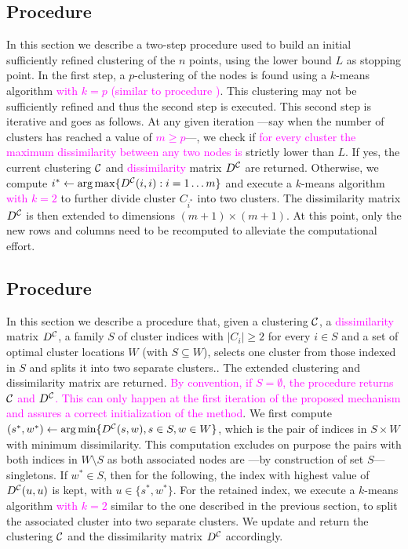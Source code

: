 \documentclass[ijoo,nonblindrev]{informs-ijoo}
\begin{document}
\subsection{Procedure \label{section:decrclust:initclust}}

In this section we describe a two-step procedure used to build an initial sufficiently refined clustering of the $n$ points, using the lower bound $L$ as stopping point. In the first step, a $p$-clustering of the nodes is found using a $k$-means algorithm \textcolor{magenta}{with $k = p$ (similar to procedure )}. This clustering may not be sufficiently refined and thus the second step is executed. This second step is iterative and goes as follows. At any given iteration ---say when the number of clusters has reached a value of \textcolor{magenta}{$m \geq p$}---, we check if \textcolor{magenta}{for every cluster the maximum dissimilarity between any two nodes is} strictly lower than $L$. If yes, the current clustering $\mathcal{C}$ and \textcolor{magenta}{dissimilarity} matrix $D^{\mathcal{C}}$ are returned. Otherwise, we compute $i^*\leftarrow\arg\max\{D^{\mathcal{C}}(i, i): i = 1\ldots m\}$ and execute a $k$-means algorithm \textcolor{magenta}{with $k = 2$} to further divide cluster $C_{i^*}$ into two clusters. The dissimilarity matrix $D^{\mathcal{C}}$ is then extended to dimensions $(m + 1)\times (m + 1)$. At this point, only the new rows and columns need to be recomputed to alleviate the computational effort.

\subsection{Procedure \label{section:decrclust:splitadd}}

In this section we describe a procedure that, given a clustering $\mathcal{C}$, a \textcolor{magenta}{dissimilarity} matrix $D^{\mathcal{C}}$, a family $S$ of cluster indices with $|C_i|\geq 2$ for every $i\in S$ and a set of optimal cluster locations $W$ (with $S\subseteq W$), selects one cluster from those indexed in $S$ and splits it into two separate clusters.. The extended clustering and dissimilarity matrix are returned. \textcolor{magenta}{By convention, if $S = \emptyset$, the procedure returns $\mathcal{C}$ and $D^{\mathcal{C}}$. This can only happen at the first iteration of the proposed mechanism and assures a correct initialization of the method}. We first compute $(s^*, w^*)\leftarrow\arg\min\{D^{\mathcal{C}}(s, w), s\in S, w\in W\}$, which is the pair of indices in $S\times W$ with minimum dissimilarity. This computation excludes on purpose the pairs with both indices in $W\setminus S$ as both associated nodes are ---by construction of set $S$--- singletons. If $w^*\in S$, then for the following, the index with highest value of $D^{\mathcal{C}}(u, u)$ is kept, with $u \in \{s^*, w^*\}$. For the retained index, we execute a $k$-means algorithm \textcolor{magenta}{with $k = 2$} similar to the one described in the previous section, to split the associated cluster into two separate clusters. We update and return the clustering $\mathcal{C}$ and the dissimilarity matrix $D^{\mathcal{C}}$ accordingly.
\end{document}
